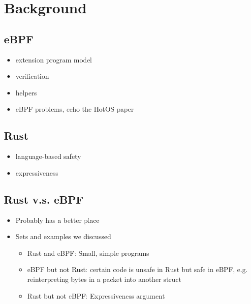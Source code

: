 \section{Background}

\subsection{eBPF}

\begin{itemize}
    \item extension program model
    \item verification
    \item helpers
    \item eBPF problems, echo the HotOS paper
\end{itemize}

\subsection{Rust}

\begin{itemize}
    \item language-based safety
    \item expressiveness
\end{itemize}

\subsection{Rust v.s. eBPF}

\begin{itemize}
    \item Probably has a better place
    \item Sets and examples we discussed
        \begin{itemize}
            \item Rust and eBPF: Small, simple programs
            \item eBPF but not Rust: certain code is unsafe in Rust but safe in
                eBPF, e.g. reinterpreting bytes in a packet into another struct
            \item Rust but not eBPF: Expressiveness argument
        \end{itemize}
\end{itemize}